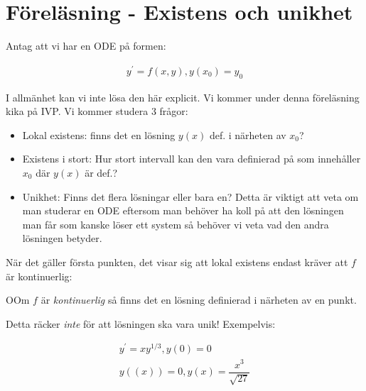 \section{Föreläsning - Existens och unikhet}

\noindent Antag att vi har en ODE på formen:
\par\bigskip


\begin{equation*}
  \begin{gathered}
    y^{\prime}=f(x,y), y(x_0)=y_0
  \end{gathered}
\end{equation*}
\par\bigskip

\noindent I allmänhet kan vi inte lösa den här explicit. Vi kommer under denna föreläsning kika på IVP. Vi kommer studera 3 frågor:

\begin{itemize}
  \item Lokal existens: finns det en lösning $y(x)$ def. i närheten av $x_0$?
  \item Existens i stort: Hur stort intervall kan den vara definierad på som innehåller $x_0$ där $y(x)$ är def.?
  \item Unikhet: Finns det flera lösningar eller bara en? Detta är viktigt att veta om man studerar en ODE eftersom man behöver ha koll på att den lösningen man får som kanske löser ett system så behöver vi veta vad den andra lösningen betyder.
\end{itemize}
\par\bigskip

\noindent När det gäller första punkten, det visar sig att lokal existens endast kräver att $f$ är kontinuerlig:
\par\bigskip

\begin{theo}
  OOm $f$ är \textit{kontinuerlig} så finns det en lösning definierad i närheten av en punkt.
\end{theo}
\par\bigskip

\noindent Detta räcker \textit{inte} för att lösningen ska vara unik! Exempelvis:

\begin{equation*}
  \begin{gathered}
    y^{\prime}=xy^{1/3}, y(0)=0\\
    y((x))=0, y(x)=\dfrac{x^3}{\sqrt{27}}
  \end{gathered}
\end{equation*}
\par\bigskip

